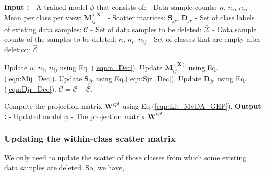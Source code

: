 \begin{algorithm}[t]
\caption{2DMvIDDA: Decremental algorithm}
    \begin{algorithmic}
	\STATE \textbf{Input :}
	\STATE - A trained model $\phi$ that consists of:
	\STATE 		\hspace{0.3cm} - Data sample counts: $n$, $n_i$, $n_{ij}$
	\STATE 		\hspace{0.3cm} - Mean per class per view: $\textbf{M}_{ij}^{(\textbf{X})}$
	\STATE 		\hspace{0.3cm} - Scatter matrices: $\textbf{S}_{jr}$, $\textbf{D}_{jr}$
	\STATE 		\hspace{0.3cm} - Set of class labels of existing data samples: $\mathcal{C}$
	\STATE 		- Set of data samples to be deleted: $\bar{\mathcal{X}}$
	\STATE 		- Data sample counts of the samples to be deleted: $\bar{n}$, $\bar{n}_{i}$, $\bar{n}_{ij}$
	\STATE 		- Set of classes that are empty after deletion: $\hat{\mathcal{C}}$ \vspace{0.1cm}

		\STATE \small Update $n$, $n_i$, $n_{ij}$ using Eq. (\ref{eqn:n_Dec}).\;
		\STATE \small Update $\textbf{M}_{ij}^{(\textbf{X})}$ using Eq.(\ref{eqn:Mij_Dec}).\;
		\STATE \small Update $\textbf{S}_{jr}$ using Eq.(\ref{eqn:Sjr_Dec}).\;
		\STATE \small Update $\textbf{D}_{jr}$ using Eq.(\ref{eqn:Djr_Dec}).\; \vspace{0.1cm}
		\STATE $\mathcal{C} = \mathcal{C} - \hat{\mathcal{C}}$.\;
		
		\STATE \small Compute the projection matrix $\textbf{W}^{opt}$ using Eq.(\ref{eqn:Lit_MvDA_GEP}).\;
	\ENDWHILE
	\STATE \textbf{Output :}
	\STATE - Updated model $\phi$
	\STATE - The projection matrix $\textbf{W}^{opt}$

\end{algorithmic}
\label{Algo_Dec}
\end{algorithm}



\subsubsection{Updating the within-class scatter matrix}
\label{ssubs:2DMvIDDA_Inc_Sw}
We only need to update the scatter of those classes from which some existing data samples are deleted. So, we have,

